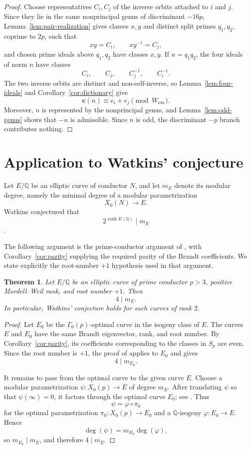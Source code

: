 \documentclass[10pt,a4paper]{amsart}
\newtheorem{theorem}{Theorem}[section]
\newcommand{\Q}{\mathbb{Q}}
\newcommand{\crow}{\mathbf{c}}
\begin{document}
\begin{proof}
Choose representatives $C_i,C_j$ of the inverse orbits attached to
$i$ and $j$. Since they lie in the same nonprincipal genus of
discriminant $-16p$, Lemma~\ref{lem:pair-realization} gives classes
$x,y$ and distinct split primes $q_1,q_2$, coprime to $2p$, such that
\[
  xy=C_i,
  \qquad
  xy^{-1}=C_j,
\]
and chosen prime ideals above $q_1,q_2$ have classes $x,y$.  If
$n=q_1q_2$, the four ideals of norm $n$ have classes
\[
  C_i,\qquad C_j,\qquad C_j^{-1},\qquad C_i^{-1}.
\]
The two inverse orbits are distinct and non-self-inverse, so
Lemma~\ref{lem:four-ideals} and Corollary~\ref{cor:dictionary} give
\[
  \crow(n)\equiv e_i+e_j\pmod{W_{\mathrm{exc}}}.
\]
Moreover, $n$ is represented by the nonprincipal genus, and
Lemma~\ref{lem:odd-genus} shows that $-n$ is admissible. Since $n$ is
odd, the discriminant $-p$ branch contributes nothing.
\end{proof}



\section{Application to Watkins' conjecture}\label{sec:watkins}

Let $E/\Q$ be an elliptic curve of conductor $N$, and let $m_E$ denote
its modular degree, namely the minimal degree of a modular parametrization
\[
  X_0(N)\longrightarrow E.
\]
Watkins conjectured that
\[
  2^{\operatorname{rank}E(\Q)}\mid m_E
\]
\cite[Conjecture~4.1]{Watkins2002}.

The following argument is the prime-conductor argument of
\cite[Theorem~1.3]{KazalickiKohen2018}, with
Corollary~\ref{cor:parity} supplying the required parity of the Brandt
coefficients. We state explicitly the root-number $+1$ hypothesis used in
that argument.


\begin{theorem}\label{thm:modular-degree}
Let $E/\Q$ be an elliptic curve of prime conductor $p>3$, positive
Mordell--Weil rank, and root number $+1$. Then
\[
  4\mid m_E.
\]
In particular, Watkins' conjecture holds for such curves of rank $2$.
\end{theorem}

\begin{proof}
Let $E_0$ be the $\Gamma_0(p)$-optimal curve in the isogeny class of
$E$. The curves $E$ and $E_0$ have the same Brandt eigenvector, rank, and
root number. By Corollary~\ref{cor:parity}, its coefficients corresponding
to the classes in $S_p$ are even. Since the root number is $+1$, the
proof of \cite[Theorem~1.3]{KazalickiKohen2018} applies to $E_0$ and gives
\[
  4\mid m_{E_0}.
\]

It remains to pass from the optimal curve to the given curve $E$. Choose a modular parametrization
$\psi:X_0(p)\to E$ of degree $m_E$. After translating $\psi$ so that
$\psi(\infty)=0$, it factors through the optimal curve $E_0$; see
\cite[Remark~1.3]{CalegariEmerton2009}. Thus
\[
  \psi=\varphi\circ\pi_0
\]
for the optimal parametrization $\pi_0:X_0(p)\to E_0$ and a
$\Q$-isogeny $\varphi:E_0\to E$. Hence
\[
  \deg(\psi)=m_{E_0}\deg(\varphi),
\]
so $m_{E_0}\mid m_E$, and therefore $4\mid m_E$.
\end{proof}
\end{document}
